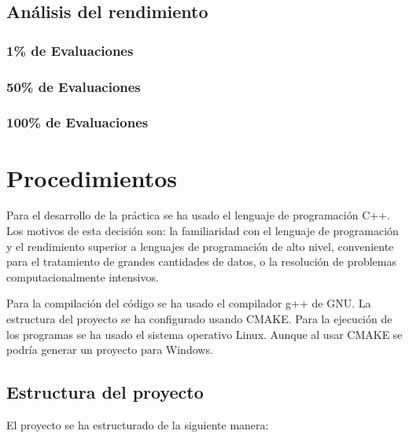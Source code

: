 \documentclass[a4paper, 12.5pt]{report}
\begin{document}
\subsection{Análisis del rendimiento}

\subsubsection{1\% de Evaluaciones}
\subsubsection{50\% de Evaluaciones}
\subsubsection{100\% de Evaluaciones}

\section{Procedimientos}

Para el desarrollo de la práctica se ha usado el lenguaje de programación C++. Los motivos de esta decisión son: la familiaridad con el lenguaje de programación y el rendimiento superior a lenguajes de programación de alto nivel, conveniente para el tratamiento de grandes cantidades de datos, o la resolución de problemas computacionalmente intensivos.

Para la compilación del código se ha usado el compilador g++ de GNU. La estructura del proyecto se ha configurado usando CMAKE. Para la ejecución de los programas se ha usado el sistema operativo Linux. Aunque al usar CMAKE se podría generar un proyecto para Windows.

\newpage

\subsection{Estructura del proyecto}

El proyecto se ha estructurado de la siguiente manera:
\end{document}
